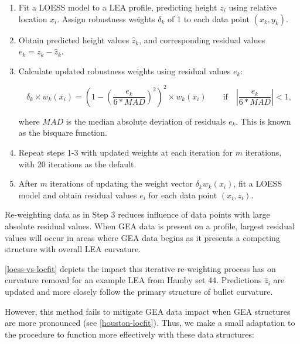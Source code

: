 \documentclass[12pt]{article}
\begin{document}
\begin{enumerate}

\item Fit a LOESS model to a LEA profile, predicting height $z_i$ using relative location $x_i$. Assign robustness weights $\delta_k$ of 1 to each data point $(x_k, y_k)$.  
\item Obtain predicted height values $\widehat{z}_k$, and corresponding residual values $e_k = z_k - \widehat{z}_k$. 
\item Calculate updated robustness weights using residual values $e_k$: 

$$\delta_k \times w_k(x_i) =\left(1 - \left(\frac{e_k}{6*MAD}\right)^2\right)^2 \times w_k(x_i) \quad \quad \mbox{if}\quad \left|\frac{e_k}{6*MAD} \right| < 1,$$

where $MAD$ is the median absolute deviation of residuals $e_k$. This is known as the bisquare function.  
\item Repeat steps 1-3 with updated weights at each iteration for $m$ iterations, with 20 iterations as the default.  
\item After $m$ iterations of updating the weight vector $\delta_k w_k(x_i)$, fit a LOESS model and obtain residual values $e_i$ for each data point $(x_i, z_i)$.  

\end{enumerate}

Re-weighting data as in Step 3 reduces influence of data points with
large absolute residual values. When GEA data is present on a profile,
largest residual values will occur in areas where GEA data begins as it
presents a competing structure with overall LEA curvature.

\autoref{loess-vs-locfit} depicts the impact this iterative re-weighting
process has on curvature removal for an example LEA from Hamby set 44.
Predictions \(\widehat{z}_i\) are updated and more closely follow the
primary structure of bullet curvature.

However, this method fails to mitigate GEA data impact when GEA
structures are more pronounced (see \autoref{houston-locfit}). Thus, we
make a small adaptation to the procedure to function more effectively
with these data structures:
\end{document}
